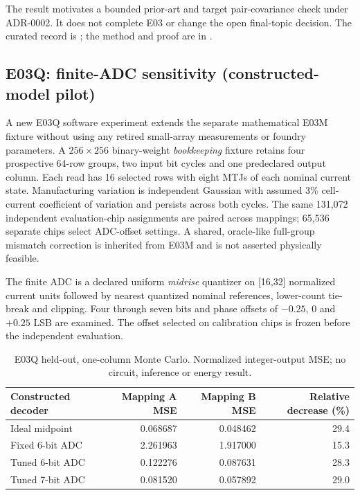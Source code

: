 The result motivates a bounded prior-art and target pair-covariance check under ADR-0002.
It does not complete E03 or change the open final-topic decision. The curated record is
; the method and proof are in
.

\subsection{E03Q: finite-ADC sensitivity (constructed-model pilot)}

A new E03Q software experiment extends the separate mathematical E03M fixture without
using any retired small-array measurements or foundry parameters. A \(256\times256\)
binary-weight \emph{bookkeeping} fixture retains four prospective 64-row groups,
two input bit cycles and one predeclared output column. Each read has 16 selected
rows with eight MTJs of each nominal current state. Manufacturing variation is
independent Gaussian with assumed 3\% cell-current coefficient of variation and
persists across both cycles. The same 131,072 independent evaluation-chip assignments
are paired across mappings; 65,536 separate chips select ADC-offset settings.
A shared, oracle-like full-group mismatch correction is inherited from E03M
and is not asserted physically feasible.

The finite ADC is a declared uniform \emph{midrise} quantizer on [16,32] normalized
current units followed by nearest quantized nominal references, lower-count tie-break
and clipping. Four through seven bits and phase offsets of
$-0.25$, 0 and $+0.25$ LSB are examined. The offset selected on calibration chips
is frozen before the independent evaluation.

\begin{table}[htbp]\centering\small
\begin{tabular}{@{}lrrr@{}}\toprule
Constructed decoder & Mapping A MSE & Mapping B MSE & Relative decrease (\%)\\\midrule
Ideal midpoint & 0.068687 & 0.048462 & 29.4\\
Fixed 6-bit ADC & 2.261963 & 1.917000 & 15.3\\
Tuned 6-bit ADC & 0.122276 & 0.087631 & 28.3\\
Tuned 7-bit ADC & 0.081520 & 0.057892 & 29.0\\\bottomrule
\end{tabular}
\caption{E03Q held-out, one-column Monte Carlo. Normalized integer-output MSE;
no circuit, inference or energy result.}
\end{table}

